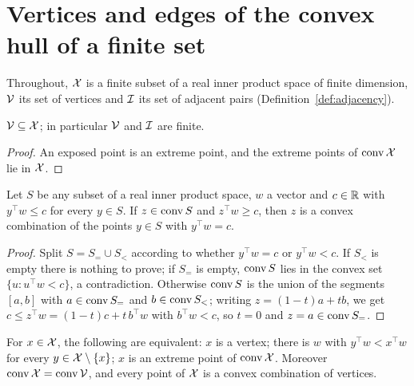 \chapter{Vertices and edges of the convex hull of a finite set}
\label{chap:prereq_polytope}

Throughout, $\mathcal{X}$ is a finite subset of a real inner product space of finite dimension, $\mathcal{V}$ its set
of vertices and $\mathcal{I}$ its set of adjacent pairs (Definition~\ref{def:adjacency}).

\begin{lemma}
  \label{lem:vertices_subset}
  \leanok
  $\mathcal{V} \subseteq \mathcal{X}$; in particular $\mathcal{V}$ and $\mathcal{I}$ are finite.
\end{lemma}

\begin{proof}
  \leanok
  An exposed point is an extreme point, and the extreme points of $\operatorname{conv} \mathcal{X}$ lie in $\mathcal{X}$.
\end{proof}

\begin{lemma}
  \label{lem:max_face}
  \leanok
  Let $S$ be any subset of a real inner product space, $w$ a vector and $c \in \mathbb{R}$ with
  $y^\top w \le c$ for every $y \in S$. If $z \in \operatorname{conv} S$ and $z^\top w \ge c$, then $z$ is a
  convex combination of the points $y \in S$ with $y^\top w = c$.
\end{lemma}

\begin{proof}
  \leanok
  Split $S = S_= \cup S_<$ according to whether $y^\top w = c$ or $y^\top w < c$. If $S_<$ is
  empty there is nothing to prove; if $S_=$ is empty, $\operatorname{conv} S$ lies in the convex set
  $\{u : u^\top w < c\}$, a contradiction. Otherwise $\operatorname{conv} S$ is the union of the segments
  $[a, b]$ with $a \in \operatorname{conv} S_=$ and $b \in \operatorname{conv} S_<$; writing $z = (1 - t) a + t b$, we get
  $c \le z^\top w = (1 - t) c + t\, b^\top w$ with $b^\top w < c$, so $t = 0$ and
  $z = a \in \operatorname{conv} S_=$.
\end{proof}

\begin{lemma}
  \label{lem:strict_expose}
  \leanok
  For $x \in \mathcal{X}$, the following are equivalent: $x$ is a vertex; there is $w$ with
  $y^\top w < x^\top w$ for every $y \in \mathcal{X} \setminus \{x\}$; $x$ is an extreme point of
  $\operatorname{conv} \mathcal{X}$. Moreover $\operatorname{conv} \mathcal{X} = \operatorname{conv} \mathcal{V}$, and every point of $\mathcal{X}$ is a convex combination of
  vertices.
\end{lemma}

